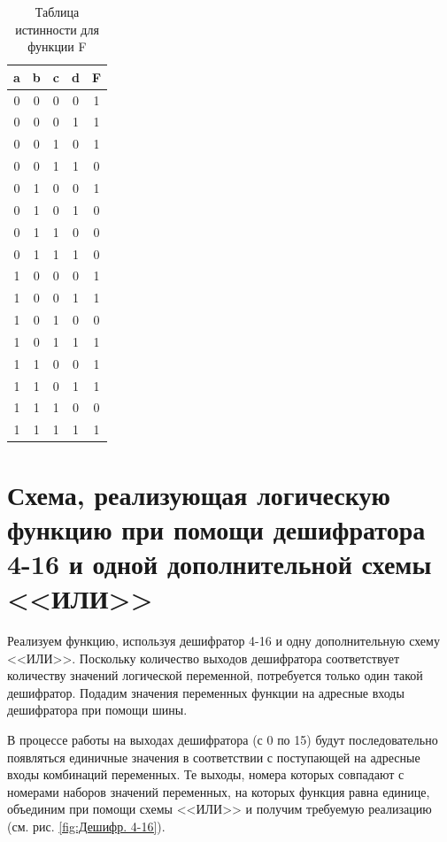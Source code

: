 \documentclass{mirea}
\begin{document}
\begin{table}[ht]
	\centering
	\caption{Таблица истинности для функции F}
	\label{table:Таблица истинности}
	\begin{tabular}{c|c|c|c|c}
		 \textbf{a} & \textbf{b} & \textbf{c} & \textbf{d} & \textbf{F} \\
		 \hline
		 0 & 0 & 0 & 0 & 1 \\
		 \hline
		 0 & 0 & 0 & 1 & 1 \\
		 \hline
		 0 & 0 & 1 & 0 & 1 \\
		 \hline
		 0 & 0 & 1 & 1 & 0 \\
		 \hline
		 0 & 1 & 0 & 0 & 1 \\
		 \hline
		 0 & 1 & 0 & 1 & 0 \\
		 \hline
		 0 & 1 & 1 & 0 & 0 \\
		 \hline
		 0 & 1 & 1 & 1 & 0 \\
		 \hline
		 1 & 0 & 0 & 0 & 1 \\
		 \hline
		 1 & 0 & 0 & 1 & 1 \\
		 \hline
		 1 & 0 & 1 & 0 & 0 \\
		 \hline
		 1 & 0 & 1 & 1 & 1 \\
		 \hline
		 1 & 1 & 0 & 0 & 1 \\
		 \hline
		 1 & 1 & 0 & 1 & 1 \\
		 \hline
		 1 & 1 & 1 & 0 & 0 \\
		 \hline
		 1 & 1 & 1 & 1 & 1 \\
	\end{tabular}
\end{table}

\section{Схема, реализующая логическую функцию при помощи дешифратора 4-16 и одной дополнительной схемы <<ИЛИ>>}
Реализуем функцию, используя дешифратор 4-16 и одну дополнительную схему <<ИЛИ>>. Поскольку количество выходов дешифратора соответствует количеству значений логической переменной, потребуется только один такой дешифратор. Подадим значения переменных функции на адресные входы дешифратора при помощи шины.

В процессе работы на выходах дешифратора (с 0 по 15) будут последовательно появляться единичные значения в соответствии с поступающей на адресные входы комбинаций переменных. Те выходы, номера которых совпадают с номерами наборов значений переменных, на которых функция равна единице, объединим при помощи схемы <<ИЛИ>> и получим требуемую реализацию (см. рис. \ref{fig:Дешифр. 4-16}).
\end{document}
